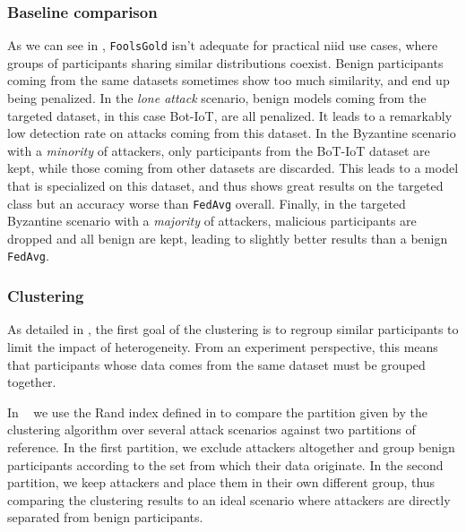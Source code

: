 \subsubsection{Baseline comparison\label{sec:eval.results.baselines}}

As we can see in , \texttt{FoolsGold} isn't adequate for practical \gls{niid} use cases, where groups of participants sharing similar distributions coexist. 
Benign participants coming from the same datasets sometimes show too much similarity, and end up being penalized. 
In the \emph{lone attack} scenario, benign models coming from the targeted dataset, in this case Bot-IoT, are all penalized.
It leads to a remarkably low detection rate on attacks coming from this dataset. 
In the Byzantine scenario with a \emph{minority} of attackers, only participants from the BoT-IoT dataset are kept, while those coming from other datasets are discarded. This leads to a model that is specialized on this dataset, and thus shows great results on the targeted class but an accuracy worse than \texttt{FedAvg} overall.
Finally, in the targeted Byzantine scenario with a \emph{majority} of attackers, malicious participants are dropped and all benign are kept, leading to slightly better results than a benign \texttt{FedAvg}.


\subsubsection{Clustering\label{sec:eval.results.cluster}}

As detailed in , the first goal of the clustering is to regroup similar participants to limit the impact of heterogeneity. 
From an experiment perspective, this means that participants whose data comes from the same dataset must be grouped together. 

In ~ we use the Rand index defined in  to compare the partition given by the clustering algorithm over several attack scenarios against two partitions of reference. 
In the first partition, we exclude attackers altogether and group benign participants according to the set from which their data originate. 
In the second partition, we keep attackers and place them in their own different group, thus comparing the clustering results to an ideal scenario where attackers are directly separated from benign participants.   

